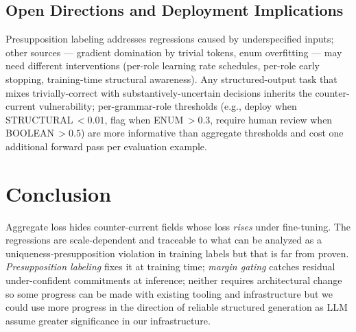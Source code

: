 \documentclass{article}
\begin{document}
\subsection{Open Directions and Deployment Implications}

Presupposition labeling addresses regressions caused by underspecified inputs; other sources --- gradient domination by trivial tokens, enum overfitting --- may need different interventions (per-role learning rate schedules, per-role early stopping, training-time structural awareness). Any structured-output task that mixes trivially-correct with substantively-uncertain decisions inherits the counter-current vulnerability; per-grammar-role thresholds (e.g., deploy when STRUCTURAL\,$<0.01$, flag when ENUM\,$>0.3$, require human review when BOOLEAN\,$>0.5$) are more informative than aggregate thresholds and cost one additional forward pass per evaluation example.



\section{Conclusion}

Aggregate loss hides counter-current fields whose loss \emph{rises} under fine-tuning. The regressions are scale-dependent and traceable to what can be analyzed as a uniqueness-presupposition violation in training labels but that is far from proven. \emph{Presupposition labeling} fixes it at training time; \emph{margin gating} catches residual under-confident commitments at inference; neither requires architectural change so some progress can be made with existing tooling and infrastructure but we could use more progress in the direction of reliable structured generation as LLM assume greater significance in our infrastructure. 
\end{document}
